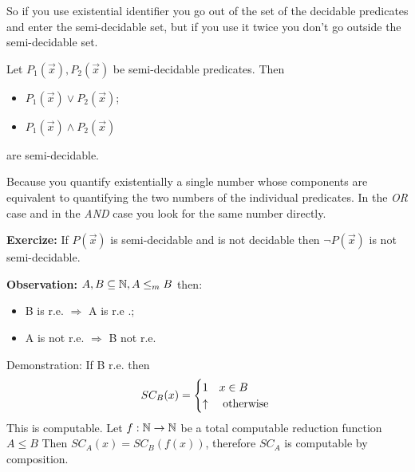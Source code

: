 So if you use existential identifier you go out of the set of the
decidable predicates and enter the semi-decidable set, but if you use
it twice you don't go outside the semi-decidable set.

\begin{theorem}
  Let $ P_1(\vec{x}), P_2(\vec{x}) $ be semi-decidable predicates. Then
  \begin{itemize}
    \item $  P_1(\vec{x}) \lor P_2(\vec{x}) $;
    \item $ P_1(\vec{x}) \land P_2(\vec{x}) $
    \end{itemize}
    are semi-decidable.
\end{theorem}

Because you quantify existentially a single number whose components
are equivalent to quantifying the two numbers of the individual
predicates. In the \textit{OR} case and in the \textit{AND} case you
look for the same number directly.

\textbf{Exercize:} If $ P(\vec{x}) $ is semi-decidable and is not
decidable then $ \lnot P(\vec{x}) $ is not semi-decidable.

\textbf{Observation:} $ A,B \subseteq \mathbb{N}, A\leq_m B $ then:
\begin{itemize}
\item B is r.e. $ \Rightarrow $ A is r.e .;
\item A is not r.e. $ \Rightarrow $ B not r.e.
\end{itemize} Demonstration: If B r.e. then
\begin{equation*} SC_B(x) = \begin{cases} 1 & x \in B \\ \uparrow & $
    otherwise $
  \end{cases}
\end{equation*} This is computable. Let $ f:\mathbb{N}\rightarrow\mathbb{N} $ be a
total computable reduction function\\ $ A\leq B $ Then $ SC_A(x) =
SC_B(f(x)) $, therefore $ SC_A $ is computable by composition.
